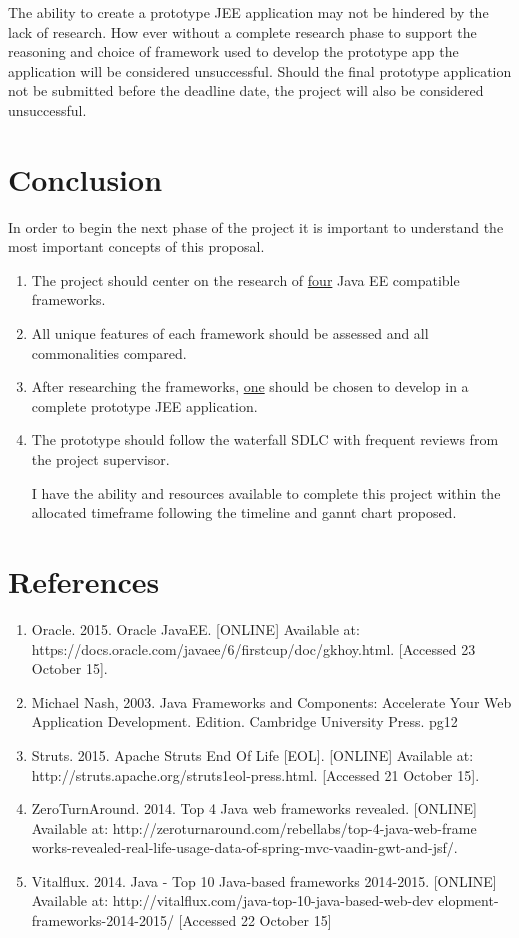 \documentclass[]{report}
\begin{document}
	The ability to create a prototype JEE application may not be hindered by the lack of research. How ever without a complete research phase to support the reasoning and choice of framework used to develop the prototype app the application will be considered unsuccessful. Should the final prototype application not be submitted before the deadline date, the project will also be considered unsuccessful. 

\newpage

\section{Conclusion}
	In order to begin the next phase of the project it is important to understand the most important concepts of this proposal.
	
	\begin{enumerate}
		\item The project should center on the research of \underline{four} Java EE compatible frameworks.
		\item All unique features of each framework should be assessed and all commonalities compared.
		\item After researching the frameworks, \underline{one} should be chosen to develop in a complete prototype JEE application.
		\item The prototype should follow the waterfall SDLC with frequent reviews from the project supervisor.
		
	I have the ability and resources available to complete this project within the allocated timeframe following the timeline and gannt chart proposed. 
	\end{enumerate}

\section{References}
	\begin{enumerate}
		\item Oracle. 2015. Oracle JavaEE. [ONLINE] Available at: \newline https://docs.oracle.com/javaee/6/firstcup/doc/gkhoy.html. [Accessed 23 October 15].
		\item Michael Nash, 2003. Java Frameworks and Components: Accelerate Your Web Application Development. Edition. Cambridge University Press. pg12
		\item Struts. 2015. Apache Struts End Of Life [EOL]. [ONLINE] Available at:
		http://struts.apache.org/struts1eol-press.html. [Accessed 21 October 15].
		\item ZeroTurnAround. 2014. Top 4 Java web frameworks revealed. [ONLINE] Available at: http://zeroturnaround.com/rebellabs/top-4-java-web-frame works-revealed-real-life-usage-data-of-spring-mvc-vaadin-gwt-and-jsf/. 
		\item Vitalflux. 2014. Java - Top 10 Java-based frameworks 2014-2015. [ONLINE] Available at: http://vitalflux.com/java-top-10-java-based-web-dev \newline elopment-frameworks-2014-2015/ [Accessed 22 October 15]
	\end{enumerate}
\end{document}
